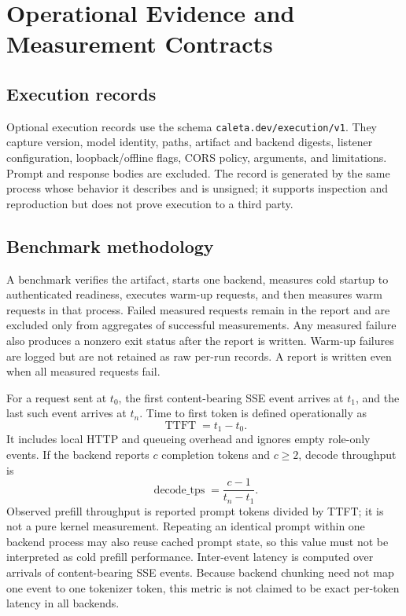 \documentclass[11pt,a4paper]{article}
\newcommand{\schema}[1]{\texttt{#1}}
\begin{document}
\section{Operational Evidence and Measurement Contracts}

\subsection{Execution records}

Optional execution records use the schema \schema{caleta.dev/execution/v1}. They capture version, model identity, paths, artifact and backend digests, listener configuration, loopback/offline flags, CORS policy, arguments, and limitations. Prompt and response bodies are excluded. The record is generated by the same process whose behavior it describes and is unsigned; it supports inspection and reproduction but does not prove execution to a third party.

\subsection{Benchmark methodology}

A benchmark verifies the artifact, starts one backend, measures cold startup to authenticated readiness, executes warm-up requests, and then measures warm requests in that process. Failed measured requests remain in the report and are excluded only from aggregates of successful measurements. Any measured failure also produces a nonzero exit status after the report is written. Warm-up failures are logged but are not retained as raw per-run records. A report is written even when all measured requests fail.

For a request sent at $t_0$, the first content-bearing SSE event arrives at $t_1$, and the last such event arrives at $t_n$. Time to first token is defined operationally as
\begin{equation}
\operatorname{TTFT} = t_1-t_0.
\end{equation}
It includes local HTTP and queueing overhead and ignores empty role-only events. If the backend reports $c$ completion tokens and $c\geq2$, decode throughput is
\begin{equation}
\operatorname{decode\_tps}=\frac{c-1}{t_n-t_1}.
\end{equation}
Observed prefill throughput is reported prompt tokens divided by TTFT; it is not a pure kernel measurement. Repeating an identical prompt within one backend process may also reuse cached prompt state, so this value must not be interpreted as cold prefill performance. Inter-event latency is computed over arrivals of content-bearing SSE events. Because backend chunking need not map one event to one tokenizer token, this metric is not claimed to be exact per-token latency in all backends.
\end{document}
